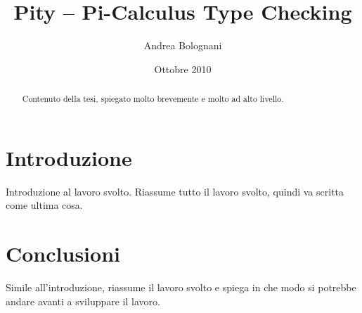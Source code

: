 \documentclass[a4paper]{article}
\begin{document}
\title{Pity -- Pi-Calculus Type Checking}
\author{Andrea Bolognani}
\date{Ottobre 2010}

\maketitle


\begin{abstract}
Contenuto della tesi, spiegato molto brevemente e molto ad alto livello.
\end{abstract}


\clearpage

\tableofcontents

\clearpage


\section{Introduzione}

Introduzione al lavoro svolto. Riassume tutto il lavoro svolto, quindi
va scritta come ultima cosa.











\section{Conclusioni}

Simile all'introduzione, riassume il lavoro svolto e spiega in che
modo si potrebbe andare avanti a sviluppare il lavoro.



\end{document}
